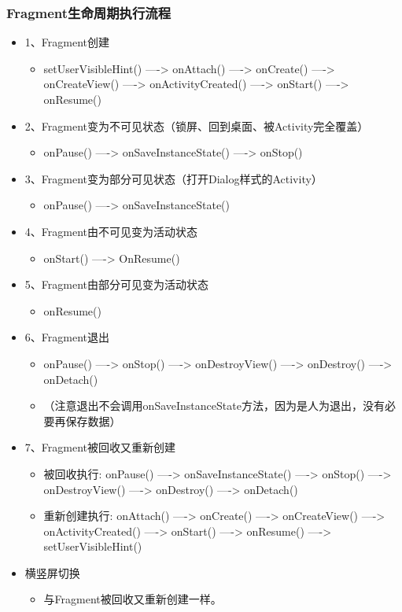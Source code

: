 \documentclass[9pt, b5paper]{article}
\begin{document}
\subsubsection{Fragment生命周期执行流程}
\label{sec-1-2-4}
\begin{itemize}
\item 1、Fragment创建
\begin{itemize}
\item setUserVisibleHint() ----> onAttach() ----> onCreate() ----> onCreateView() ----> onActivityCreated() ----> onStart() ----> onResume()
\end{itemize}
\item 2、Fragment变为不可见状态（锁屏、回到桌面、被Activity完全覆盖）
\begin{itemize}
\item onPause() ----> onSaveInstanceState() ----> onStop()
\end{itemize}
\item 3、Fragment变为部分可见状态（打开Dialog样式的Activity）
\begin{itemize}
\item onPause() ----> onSaveInstanceState()
\end{itemize}
\item 4、Fragment由不可见变为活动状态
\begin{itemize}
\item onStart() ----> OnResume()
\end{itemize}
\item 5、Fragment由部分可见变为活动状态
\begin{itemize}
\item onResume()
\end{itemize}
\item 6、Fragment退出
\begin{itemize}
\item onPause() ----> onStop() ----> onDestroyView() ----> onDestroy() ----> onDetach()
\item （注意退出不会调用onSaveInstanceState方法，因为是人为退出，没有必要再保存数据）
\end{itemize}
\item 7、Fragment被回收又重新创建
\begin{itemize}
\item 被回收执行: onPause() ----> onSaveInstanceState() ----> onStop() ----> onDestroyView() ----> onDestroy() ----> onDetach()
\item 重新创建执行: onAttach() ----> onCreate() ----> onCreateView() ----> onActivityCreated() ----> onStart() ----> onResume() ----> setUserVisibleHint()
\end{itemize}
\item 横竖屏切换
\begin{itemize}
\item 与Fragment被回收又重新创建一样。
\end{itemize}
\end{itemize}
\end{document}
